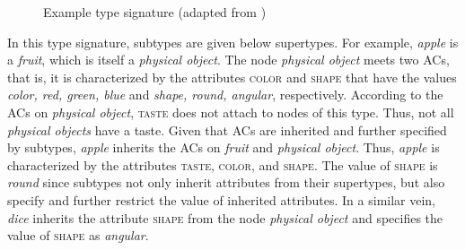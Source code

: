 \documentclass[output=paper]{langsci/langscibook}
\begin{document}
\begin{figure}
	
		\caption{\label{fig:signature}Example type signature (adapted from \citealp[204]{Petersen.2014})\hspace*{-10mm}}
	
\end{figure}

In this type signature, subtypes are given below supertypes. For example, \textit{apple} is a \textit{fruit}, which is itself a \textit{physical object}. The node \textit{physical object} meets two ACs, that is, it is characterized by the attributes \textsc{color} and \textsc{shape} that have the values \textit{color, red, green, blue} and \textit{shape, round, angular}, respectively. According to the ACs on \textit{physical object}, \textsc{taste} does not attach to nodes of this type. Thus, not all \textit{physical objects} have a taste. Given that ACs are inherited and further specified by subtypes, \textit{apple} inherits the ACs on \textit{fruit} and \textit{physical object}. Thus, \textit{apple} is characterized by the attributes \textsc{taste}, \textsc{color}, and  \textsc{shape}. The value of \textsc{shape} is \textit{round} since subtypes not only inherit attributes from their supertypes, but also specify and further restrict the value of inherited attributes. In a similar vein, \textit{dice} inherits the attribute \textsc{shape} from the node \textit{physical object} and specifies the value of \textsc{shape} as \textit{angular}.
\end{document}

